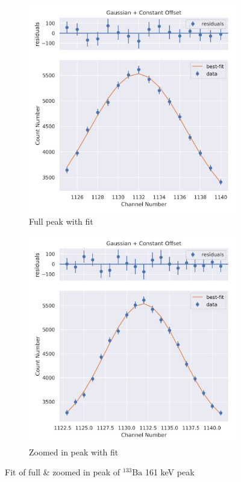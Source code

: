 \documentclass[11pt,a4paper]{article}
\newcommand{\element}[2]{$^{#2}\textrm{#1}$}
\begin{document}
\begin{figure}[H]
  \centering
  \begin{subfigure}{.5\linewidth}
    \centering
    \includegraphics[width=\linewidth]{./Images/Barium133/Gauss/Gauss_2_Full.png}
    \caption{Full peak with fit}
  \end{subfigure}%
  \begin{subfigure}{.5\linewidth}
    \centering
    \includegraphics[width=\linewidth]{./Images/Barium133/Gauss/Gauss_2_Zoom.png}
    \caption{Zoomed in peak with fit}
  \end{subfigure}
  \caption{Fit of full \& zoomed in peak of \element{Ba}{133} 161 keV peak}
\end{figure}
\end{document}
